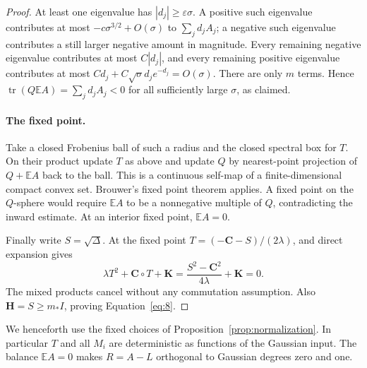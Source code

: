 \begin{proof}
At least one eigenvalue has \(|d_j|\ge\varepsilon\sigma\). A positive such eigenvalue contributes at most \(-c\sigma^{3/2}+O(\sigma)\) to \(\sum_jd_jA_j\); a negative such eigenvalue contributes a still larger negative amount in magnitude. Every remaining negative eigenvalue contributes at most \(C|d_j|\), and every remaining positive eigenvalue contributes at most
\(Cd_j+C\sqrt\sigma d_je^{-d_j}=O(\sigma)\).
There are only \(m\) terms. Hence \(\operatorname{tr}(Q\mathbb EA)=\sum_jd_jA_j<0\) for all sufficiently large \(\sigma\), as claimed.

\paragraph{The fixed point.}
Take a closed Frobenius ball of such a radius and the closed spectral box for \(T\). On their product update \(T\) as above and update \(Q\) by nearest-point projection of \(Q+\mathbb EA\) back to the ball. This is a continuous self-map of a finite-dimensional compact convex set. Brouwer's fixed point theorem \cite{Brouwer1911} applies. A fixed point on the \(Q\)-sphere would require \(\mathbb EA\) to be a nonnegative multiple of \(Q\), contradicting the inward estimate. At an interior fixed point, \(\mathbb EA=0\).

Finally write \(S=\sqrt\Delta\). At the fixed point \(T=(-\mathbf C-S)/(2\lambda)\), and direct expansion gives
\[
\lambda T^2+\mathbf C\circ T+\mathbf K
=\frac{S^2-\mathbf C^2}{4\lambda}+\mathbf K=0.
\]
The mixed products cancel without any commutation assumption. Also \(\mathbf H=S\ge m_*I\), proving Equation~\eqref{eq:8}.
\end{proof}

We henceforth use the fixed choices of Proposition~\ref{prop:normalization}. In particular \(T\) and all \(M_i\) are deterministic as functions of the Gaussian input. The balance \(\mathbb EA=0\) makes \(R=A-L\) orthogonal to Gaussian degrees zero and one.
